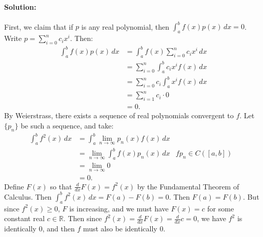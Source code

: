 \documentclass{article}
\begin{document}
\begin{enumerate}
    \paragraph{Solution: }First, we claim that if $p$ is any real polynomial, then $\int_{a}^{b} f(x)p(x) \, d x =0$. Write $p=\sum_{i=0}^{n} c_ix^{i}$. Then:
    \begin{align*}
    \int_{a}^{b} f(x)p(x) \, d x &=\int_{a}^{b} f(x)\sum_{i=0}^{n} c_ix^{i} \, d x \\&=\sum_{i=0}^{n} \int_{a}^{b} c_ix^{i}f(x) \, d x \\&=\sum_{i=0}^{n}c_i \int_{a}^{b} x^{i}f(x) \, d x \\&=\sum_{i=1}^{n} c_i \cdot 0\\&=0
    .\end{align*}
    By Weierstrass, there exists a sequence of real polynomials convergent to $f$. Let $\{p_n\}$ be such a sequence, and take:
    \begin{align*}
        \int_{a}^{b} f^2(x) \, d x &= \int_{a}^{b} \lim_{n \to \infty} p_n(x) f(x)\, d x  \\
           &= \lim_{n \to \infty} \int_{a}^{b} f(x)p_n(x) \, d x  &\text{$fp_n\in C([a,b])$ }\\
        &= \lim_{n \to \infty} 0 \\
        &= 0 
    .\end{align*}
    Define $F(x)$ so that $\frac{d}{dx}F(x)=f^2(x)$ by the Fundamental Theorem of Calculus. Then $\int_{a}^{b} f^2(x) \, d x =F(a)-F(b)=0$. Then $F(a)=F(b)$. But since $f^2(x)\ge 0$, $F$ is increasing, and we must have $F(x)=c$ for some constant real $c\in \mathbb{R}$. Then since $f^2(x)=\frac{d}{dx}F(x)=\frac{d}{dx}c=0$, we have $f^2$ is identically $0$, and then $f$ must also be identically $0$.
\end{enumerate}
\end{document}
